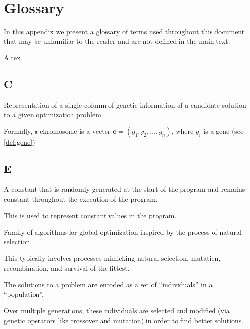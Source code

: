 \chapter{Glossary}
\label{appendix:glossary}
  In this appendix we present a glossary of terms used throughout this document 
  that may be unfamiliar to the reader and are not defined in the main text.

  {A.tex}

  \section*{C}
    \begin{definition}[Chromosome]
    \label{def:chromosome}
      Representation of a single column of genetic information of a candidate solution to a given
      optimization problem.

      Formally, a chromosome is a vector \(\textbf{c} = (g_1, g_2, \dots, g_n)\), where \(g_i\) is a
      gene (see \vref{def:gene}).
    \end{definition}

  \section*{E}
    \begin{definition}
    \label{def:ephemeral_constant}
      A constant that is randomly generated at the start of the program and 
      remains constant throughout the execution of the program.

      This is used to represent constant values in the program.
    \end{definition}

    \begin{definition}
    \label{def:evolutionary_computation}
      Family of algorithms for global optimization inspired by the process of natural selection.

      This typically involves processes mimicking natural selection, mutation, recombination, and 
      survival of the fittest.

      The solutions to a problem are encoded as a set of \enquote{individuals} in a 
      \enquote{population}.

      Over multiple generations, these individuals are selected and modified (via genetic operators 
      like crossover and mutation) in order to find better solutions.
    \end{definition}
    
